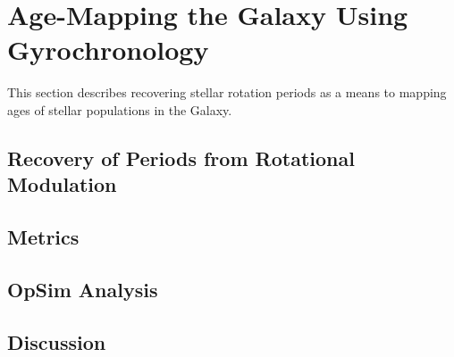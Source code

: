 %
%

\section{Age-Mapping the Galaxy Using Gyrochronology}
\def\secname{rotatationalvariables}\label{sec:\secname}

This section describes recovering stellar rotation periods as a means to
mapping ages of stellar populations in the Galaxy.

\subsection{Recovery of Periods from Rotational Modulation}


\subsection{Metrics}
\label{sec:\secname:metrics}



\subsection{OpSim Analysis}
\label{sec:\secname:analysis}



\subsection{Discussion}
\label{sec:\secname:discussion}


\navigationbar
